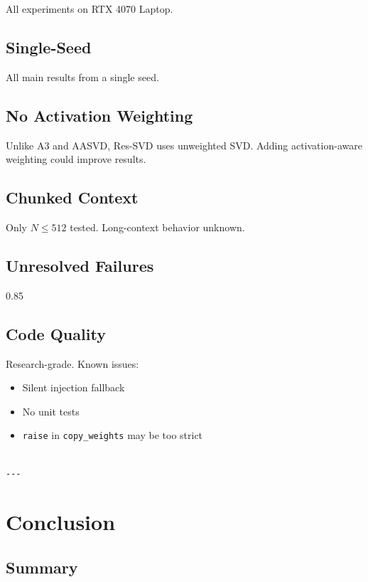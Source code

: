 All experiments on RTX 4070 Laptop.

\subsection{Single-Seed}

All main results from a single seed.

\subsection{No Activation Weighting}

Unlike A3 and AASVD, Res-SVD uses unweighted SVD. Adding activation-aware 
weighting could improve results.

\subsection{Chunked Context}

Only $N \leq 512$ tested. Long-context behavior unknown.

\subsection{Unresolved Failures}

0.85

\subsection{Code Quality}

Research-grade. Known issues:
\begin{itemize}
\item Silent injection fallback
\item No unit tests
\item \texttt{raise} in \texttt{copy\_weights} may be too strict
\end{itemize}
\begin{lstlisting}

---
\end{lstlisting}

\section{Conclusion}

\subsection{Summary}

